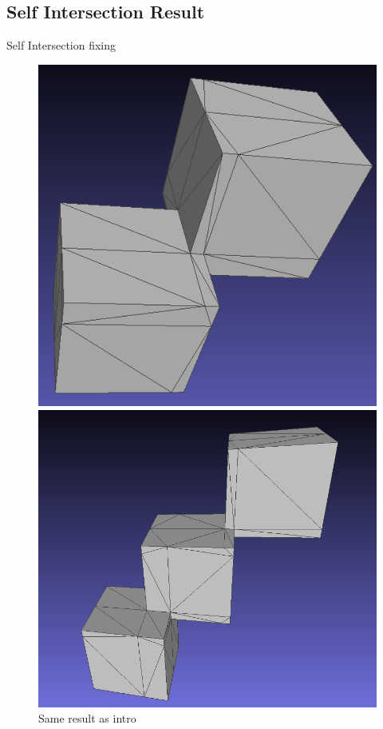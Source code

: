 \documentclass[10pt]{beamer}
\begin{document}
\subsection{Self Intersection Result}
\begin{frame}{Self Intersection fixing}
    \begin{figure}
        \centering
        \begin{minipage}[b]{0.23\textwidth}
          \centering
          \includegraphics[width=\textwidth]{../image/2cubesksr.png}
          \caption{Same result as intro}
        \end{minipage}\hfill
        \begin{minipage}[b]{0.23\textwidth}
          \centering
          \includegraphics[width=\textwidth]{../image/3cubesksr2.png}

\end{minipage}
\end{figure}
\end{frame}
\end{document}
